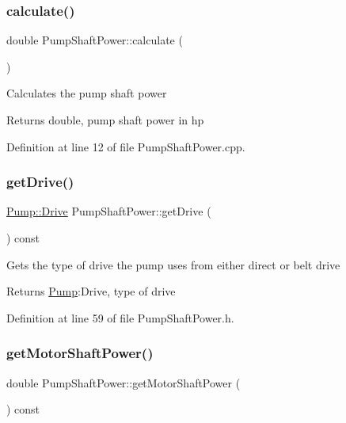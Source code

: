 \subsubsection{\texorpdfstring{calculate()}{calculate()}}
{\footnotesize\ttfamily double Pump\+Shaft\+Power\+::calculate (\begin{DoxyParamCaption}{ }\end{DoxyParamCaption})}

Calculates the pump shaft power \begin{DoxyReturn}{Returns}
double, pump shaft power in hp 
\end{DoxyReturn}


Definition at line 12 of file Pump\+Shaft\+Power.\+cpp.

\mbox{\label{class_pump_shaft_power_a3d6529d7f5ce8ef194af9abe5e6399b6}} 
\subsubsection{\texorpdfstring{get\+Drive()}{getDrive()}}
{\footnotesize\ttfamily \hyperlink{class_pump_a32bf0ade131a11bb3b3fb374f638e983}{Pump\+::\+Drive} Pump\+Shaft\+Power\+::get\+Drive (\begin{DoxyParamCaption}{ }\end{DoxyParamCaption}) const\hspace{0.3cm}{\ttfamily [inline]}}

Gets the type of drive the pump uses from either direct or belt drive \begin{DoxyReturn}{Returns}
\hyperlink{class_pump}{Pump}\+:Drive, type of drive 
\end{DoxyReturn}


Definition at line 59 of file Pump\+Shaft\+Power.\+h.

\mbox{\label{class_pump_shaft_power_acb91eadb960f946ffee5373d4839a5be}} 
\subsubsection{\texorpdfstring{get\+Motor\+Shaft\+Power()}{getMotorShaftPower()}}
{\footnotesize\ttfamily double Pump\+Shaft\+Power\+::get\+Motor\+Shaft\+Power (\begin{DoxyParamCaption}{ }\end{DoxyParamCaption}) const\hspace{0.3cm}{\ttfamily [inline]}}

